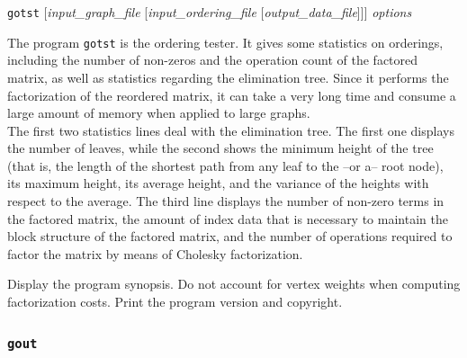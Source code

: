 \begin{itemize}
\progsyn
\texttt{gotst} [{\it input\_graph\_file} [{\it input\_ordering\_file} [{\it output\_data\_file}]]] {\it options}

\progdes
The program \texttt{gotst} is the ordering tester. It gives some
statistics on orderings, including the number of non-zeros and
the operation count of the factored matrix, as well as statistics
regarding the elimination tree. Since it performs the factorization
of the reordered matrix, it can take a very long time and consume
a large amount of memory when applied to large graphs.
\\
The first two statistics lines deal with the elimination tree. The
first one displays the number of leaves, while the second shows
the minimum height of the tree (that is, the
length of the shortest path from any leaf to the --or a-- root node),
its maximum height, its average height, and the variance of the
heights with respect to the average.
The third line displays the number of non-zero terms in the factored
matrix, the amount of index data that is necessary to maintain the
block structure of the factored matrix, and the number of operations
required to factor the matrix by means of Cholesky factorization.

\progopt
\begin{itemize}
\iteme[\texttt{-h}]
Display the program synopsis.
\iteme[\texttt{-v}]
Do not account for vertex weights when computing factorization costs.
\iteme[\texttt{-V}]
Print the program version and copyright.
\end{itemize}
\end{itemize}

\subsubsection{\texttt{gout}}
\label{sec-prog-gout}

